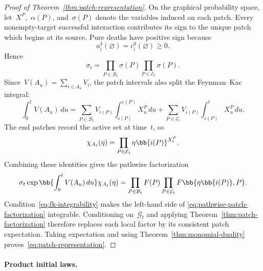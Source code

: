 \begin{proof}[Proof of Theorem~\ref{thm:patch-representation}]
On the graphical probability space, let~$X^P$,~$\alpha(P)$, and~$\sigma(P)$
denote the variables induced on each patch. Every nonempty-target successful
interaction contributes its sign to the unique patch which begins at its
source. Pure deaths have positive sign because
\begin{equation*}
a_i^\delta(\varnothing)
=
c_i^0(\varnothing)
\geq0.
\end{equation*}
Hence
\begin{equation*}
\sigma_t
=
\prod_{P\in\mathcal B_t}\sigma(P)
\prod_{P\in\mathcal E_t}\sigma(P).
\end{equation*}
Since~$V(A_u)=\sum_{i\in A_u}V_i$, the patch intervals also split the
Feynman--Kac integral:
\begin{equation*}
\int_0^tV(A_u)\,du
=
\sum_{P\in\mathcal B_t}
V_{i(P)}\int_{s(P)}^{e(P)}X_u^P\,du
+
\sum_{P\in\mathcal E_t}
V_{i(P)}\int_{s(P)}^tX_u^P\,du.
\end{equation*}
The end patches record the active set at time~$t$, so
\begin{equation*}
\chi_{A_t}(\eta)
=
\prod_{P\in\mathcal E_t}
\eta\bb{i(P)}^{X_t^P}.
\end{equation*}
Combining these identities gives the pathwise factorization
\begin{equation}
\label{eq:pathwise-patch-factorization}
\sigma_t
\exp\bb{\int_0^tV(A_u)\,du}
\chi_{A_t}(\eta)
=
\prod_{P\in\mathcal B_t}F(P)
\prod_{P\in\mathcal E_t}F\bb{\eta\bb{i(P)},P}.
\end{equation}
Condition~\eqref{eq:fk-integrability} makes the left-hand side of
\eqref{eq:pathwise-patch-factorization} integrable. Conditioning on~$\mathcal
G_t$ and applying Theorem~\ref{thm:patch-factorization} therefore replaces
each local factor by its consistent patch expectation. Taking expectation and
using Theorem~\ref{thm:monomial-duality}
proves~\eqref{eq:patch-representation}.
\end{proof}

\paragraph{Product initial laws.}
\label{subsec:general-initial-laws}

